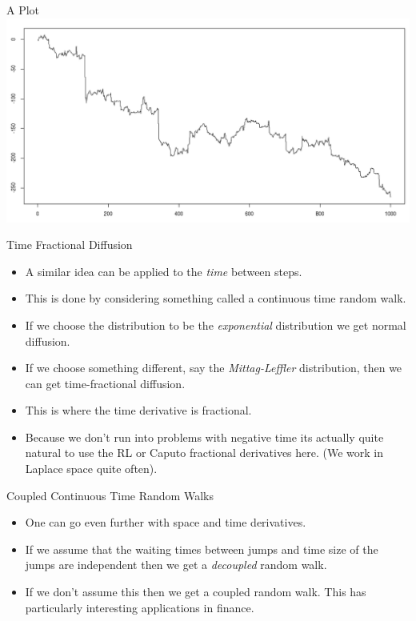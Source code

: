 \documentclass[pdf]{beamer}
\begin{document}
\begin{frame}{A Plot}
	\includegraphics[scale=0.3]{stableProcess} 
\end{frame}


\begin{frame}{Time Fractional Diffusion}
    \begin{itemize}
        \item A similar idea can be applied to the \emph{time} between steps. 
        \item This is done by considering something called a continuous time random walk.
        \item If we choose the distribution to be the \emph{exponential} distribution we get normal diffusion.
        \item If we choose something different, say the \emph{Mittag-Leffler} distribution, then we can get time-fractional diffusion.
        \item This is where the time derivative is fractional.
        \item Because we don't run into problems with negative time its actually quite natural to use the RL or Caputo fractional derivatives here. (We work in Laplace space quite often).
    \end{itemize}
\end{frame}
	

\begin{frame}{Coupled Continuous Time Random Walks}
    \begin{itemize}
        \item One can go even further with space and time derivatives. 
        \item If we assume that the waiting times between jumps and time size of the jumps are independent then we get a \emph{decoupled} random walk.
        \item If we don't assume this then we get a coupled random walk. This has particularly interesting applications in finance.
    \end{itemize}
\end{frame}
\end{document}
